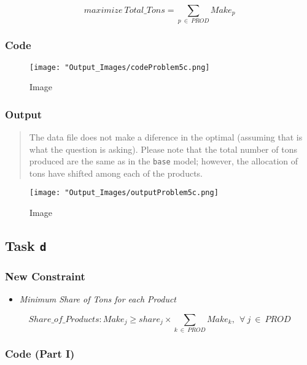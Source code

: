 \documentclass[
  12pt,
]{article}
\providecommand{\tightlist}{%
  \setlength{\itemsep}{0pt}\setlength{\parskip}{0pt}}
\begin{document}
\[
maximize \ Total\_Tons = \sum_{p \ \in \ PROD} Make_{p}
\]

\hypertarget{code-7}{%
\subsubsection{Code}\label{code-7}}

\begin{figure}
\centering
\texttt{[image: "Output\_Images/codeProblem5c.png]}
\caption{Image}
\end{figure}

\hypertarget{output-7}{%
\subsubsection{Output}\label{output-7}}

\begin{quote}
The data file does not make a diference in the optimal (assuming that is
what the question is asking). Please note that the total number of tons
produced are the same as in the \texttt{base} model; however, the
allocation of tons have shifted among each of the products.
\end{quote}

\begin{figure}
\centering
\texttt{[image: "Output\_Images/outputProblem5c.png]}
\caption{Image}
\end{figure}

\hypertarget{task-d-1}{%
\subsection{\texorpdfstring{Task \texttt{d}}{Task d}}\label{task-d-1}}

\hypertarget{new-constraint}{%
\subsubsection{New Constraint}\label{new-constraint}}

\begin{itemize}
\tightlist
\item
  \emph{Minimum Share of Tons for each Product}
\end{itemize}

\[
Share\_of\_Products: Make_{j} \geq share_{j} \times 
\sum_{k \ \in \ PROD} Make_{k}, \ \  \forall \ j \ \in \ PROD
\]

\hypertarget{code-part-i}{%
\subsubsection{Code (Part I)}\label{code-part-i}}
\end{document}

